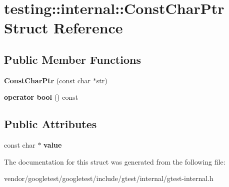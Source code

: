 \hypertarget{structtesting_1_1internal_1_1ConstCharPtr}{}\section{testing\+:\+:internal\+:\+:Const\+Char\+Ptr Struct Reference}
\label{structtesting_1_1internal_1_1ConstCharPtr}
\subsection*{Public Member Functions}
\begin{DoxyCompactItemize}
\item 
{\bfseries Const\+Char\+Ptr} (const char $\ast$str)\hypertarget{structtesting_1_1internal_1_1ConstCharPtr_ae94f6453fa679d815994eccc63062907}{}\label{structtesting_1_1internal_1_1ConstCharPtr_ae94f6453fa679d815994eccc63062907}

\item 
{\bfseries operator bool} () const \hypertarget{structtesting_1_1internal_1_1ConstCharPtr_a891bc286350b81d1a147101c0bae5b1d}{}\label{structtesting_1_1internal_1_1ConstCharPtr_a891bc286350b81d1a147101c0bae5b1d}

\end{DoxyCompactItemize}
\subsection*{Public Attributes}
\begin{DoxyCompactItemize}
\item 
const char $\ast$ {\bfseries value}\hypertarget{structtesting_1_1internal_1_1ConstCharPtr_adba40d23d5986904b605946f643cf26e}{}\label{structtesting_1_1internal_1_1ConstCharPtr_adba40d23d5986904b605946f643cf26e}

\end{DoxyCompactItemize}


The documentation for this struct was generated from the following file\+:\begin{DoxyCompactItemize}
\item 
vendor/googletest/googletest/include/gtest/internal/gtest-\/internal.\+h\end{DoxyCompactItemize}
